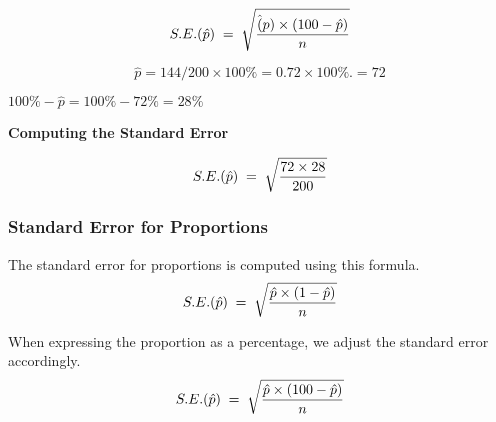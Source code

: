 \documentclass[]{report}
\begin{document}
\[
S.E. (\hat{p}) \;=\; \sqrt{ {\hat(p) \times (100 -\hat{p} )\over n}}
\]




\[
\hat{p} = {144/200}  \times 100\%  = 0.72 \times 100\%.  = 72%
\]

$100\% - \hat{p} = 100\% - 72\% = 28\% $


\textbf{Computing the Standard Error}

\[
S.E. (\hat{p}) \;=\; \sqrt{ {72 \times 28 \over 200 }}
\]



{

\subsubsection{ Standard Error for Proportions}

The standard error for proportions is computed using this formula.
\[
S.E. (\hat{p}) \;=\; \sqrt{ {\hat{p} \times (1-\hat{p} )\over n}}
\]


When expressing the proportion as a percentage, we adjust the standard error accordingly.
\[
S.E. (\hat{p}) \;=\; \sqrt{ {\hat{p} \times (100 -\hat{p} )\over n}}
\]



}
\end{document}

